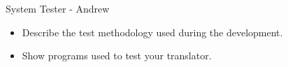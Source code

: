 System Tester - Andrew
\begin{itemize}
\item Describe the test methodology used during the development.
\item Show programs used to test your translator.
\end{itemize}